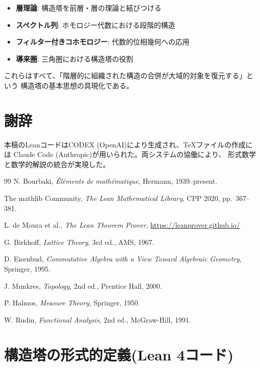 \documentclass[a4paper,12pt]{ltjsarticle}
\theoremstyle{definition}
\begin{document}
\begin{itemize}
\item \textbf{層理論}: 構造塔を前層・層の理論と結びつける
\item \textbf{スペクトル列}: ホモロジー代数における段階的構造
\item \textbf{フィルター付きコホモロジー}: 代数的位相幾何への応用
\item \textbf{導来圏}: 三角圏における構造塔の役割
\end{itemize}

これらはすべて、「階層的に組織された構造の合併が大域的対象を復元する」という
構造塔の基本思想の具現化である。

\section*{謝辞}
本稿のLeanコードはCODEX (OpenAI)により生成され、TeXファイルの作成には
Claude Code (Anthropic)が用いられた。両システムの協働により、
形式数学と数学的解説の統合が実現した。

\begin{thebibliography}{99}
N. Bourbaki, \textit{Éléments de mathématique}, Hermann, 1939--present.

The mathlib Community, \textit{The Lean Mathematical Library},
CPP 2020, pp.~367--381.

L. de Moura et al., \textit{The Lean Theorem Prover},
\url{https://leanprover.github.io/}

G. Birkhoff, \textit{Lattice Theory}, 3rd ed., AMS, 1967.

D. Eisenbud, \textit{Commutative Algebra with a View Toward Algebraic Geometry},
Springer, 1995.

J. Munkres, \textit{Topology}, 2nd ed., Prentice Hall, 2000.

P. Halmos, \textit{Measure Theory}, Springer, 1950.

W. Rudin, \textit{Functional Analysis}, 2nd ed., McGraw-Hill, 1991.
\end{thebibliography}

\appendix

\section{構造塔の形式的定義(Lean 4コード)}
\end{document}
